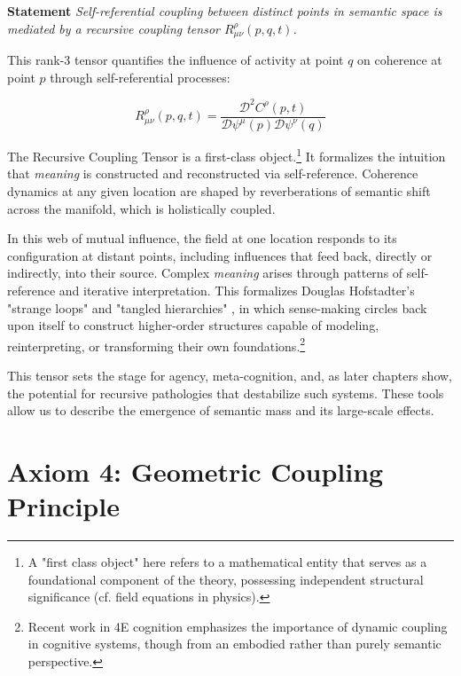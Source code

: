 \textbf{Statement} \textit{Self-referential coupling between distinct points in semantic space is mediated by a recursive coupling tensor \(R^\rho_{\mu\nu}(p,q,t)\).}

This rank-3 tensor quantifies the influence of activity at point \(q\) on coherence at point \(p\) through self-referential processes:

\begin{equation}
R^\rho_{\mu\nu}(p,q,t) = \frac{\mathcal{D}^2 C^\rho(p,t)}{\mathcal{D} \psi^\mu(p) \mathcal{D} \psi^\nu(q)}
\end{equation}

The Recursive Coupling Tensor is a first-class object.\footnote{A "first class object" here refers to a mathematical entity that serves as a foundational component of the theory, possessing independent structural significance (cf. field equations in physics).} It formalizes the intuition that \textit{meaning} is constructed and reconstructed via self-reference. Coherence dynamics at any given location are shaped by reverberations of semantic shift across the manifold, which is holistically coupled.

In this web of mutual influence, the field at one location responds to its configuration at distant points, including influences that feed back, directly or indirectly, into their source. Complex \textit{meaning} arises through patterns of self-reference and iterative interpretation. This formalizes Douglas Hofstadter's "strange loops" and "tangled hierarchies" \autocite{Hofstadter1979, Hofstadter2007}, in which sense-making circles back upon itself to construct higher-order structures capable of modeling, reinterpreting, or transforming their own foundations.\footnote{Recent work in 4E cognition \autocite{Newen2018, Gallagher2020} emphasizes the importance of dynamic coupling in cognitive systems, though from an embodied rather than purely semantic perspective.}

This tensor sets the stage for agency, meta-cognition, and, as later chapters show, the potential for recursive pathologies that destabilize such systems. These tools allow us to describe the emergence of semantic mass and its large-scale effects.


\section{Axiom 4: Geometric Coupling Principle}
\label{1.4:axiom_4_geometric_coupling_principle}

